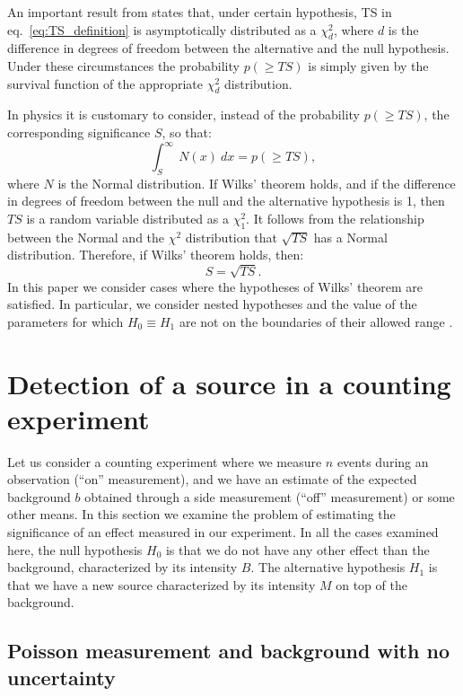 \documentclass[twocolumn]{aastex61}
\renewcommand{\textbf}{}
\begin{document}
An important result from \citet{Wilks} states that, under certain hypothesis, TS in eq.~\ref{eq:TS_definition} is asymptotically distributed as a $\chi^{2}_{d}$, where $d$ is the difference in degrees of freedom between the alternative and the null hypothesis. Under these circumstances the probability $p(\geq TS)$ is simply given by the survival function of the appropriate $\chi^2_d$ distribution.

In physics it is customary to consider, instead of the probability $p(\geq TS)$, the corresponding significance $S$, so that:
$$
\int_{S}^{\infty}~N(x)~dx = p(\geq TS),
$$
where $N$ is the Normal distribution. If Wilks' theorem holds, and if the difference in degrees of freedom between the null and the alternative hypothesis is 1, then $TS$ is a random variable distributed as a $\chi^{2}_{1}$. It follows from the relationship between the Normal and the $\chi^2$ distribution that $\sqrt{TS}$ has a Normal distribution. Therefore, if Wilks' theorem holds, then:
\begin{equation}
S = \sqrt{TS}.
\label{eq:wilks_significance}
\end{equation}
\textbf{In this paper we consider cases where the hypotheses of Wilks' theorem are satisfied. In particular, we consider nested hypotheses and the value of the parameters for which $H_{0} \equiv H_{1}$ are not on the boundaries of their allowed range \citep{Protassov}.}

\section{Detection of a source in a counting experiment}

    Let us consider a counting experiment where we measure $n$ events during an observation (``on'' measurement), and we have an estimate of the expected background $b$ obtained through a side measurement (``off'' measurement) or some other means. In this section we examine the problem of estimating the significance of an effect measured in our experiment. In all the cases examined here, the null hypothesis $H_{0}$ is that we do not have any other effect than the background, characterized by its intensity $B$. The alternative hypothesis $H_{1}$ is that we have a new source characterized by its intensity $M$ on top of the background.

\subsection{Poisson measurement and background with no uncertainty}
\end{document}
